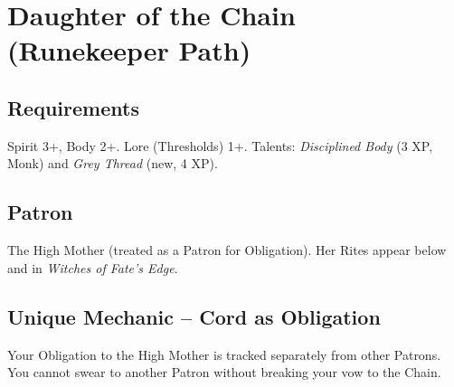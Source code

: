 \documentclass[10pt,twoside]{book}
\begin{document}
\section{Daughter of the Chain (Runekeeper Path)}
\subsection*{Requirements}
Spirit 3+, Body 2+. Lore (Thresholds) 1+. Talents: \textit{Disciplined Body} (3 XP, Monk) and \textit{Grey Thread} (new, 4 XP).

\subsection*{Patron}
The High Mother (treated as a Patron for Obligation). Her Rites appear below and in \textit{Witches of Fate's Edge}.

\subsection*{Unique Mechanic – Cord as Obligation}
Your Obligation to the High Mother is tracked separately from other Patrons. You cannot swear to another Patron without breaking your vow to the Chain.
\end{document}
